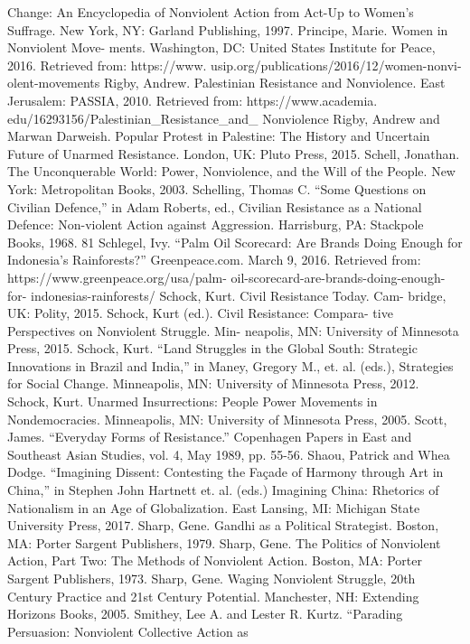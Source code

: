 \documentclass[twoside,a4paper,12pt,fleqn,openany]{extbook}
\begin{document}
Change: An Encyclopedia of Nonviolent Action
from Act-Up to Women’s Suffrage. New York,
NY: Garland Publishing, 1997.
Principe, Marie. Women in Nonviolent Move-
ments. Washington, DC: United States Institute
for Peace, 2016. Retrieved from: https://www.
usip.org/publications/2016/12/women-nonvi-
olent-movements
Rigby, Andrew. Palestinian Resistance and
Nonviolence. East Jerusalem: PASSIA, 2010.
Retrieved from: https://www.academia.
edu/16293156/Palestinian_Resistance_and_
Nonviolence
Rigby, Andrew and Marwan Darweish. Popular
Protest in Palestine: The History and Uncertain
Future of Unarmed Resistance. London, UK:
Pluto Press, 2015.
Schell, Jonathan. The Unconquerable World:
Power, Nonviolence, and the Will of the People.
New York: Metropolitan Books, 2003.
Schelling, Thomas C. “Some Questions on
Civilian Defence,” in Adam Roberts, ed., Civilian
Resistance as a National Defence: Non-violent
Action against Aggression. Harrisburg, PA:
Stackpole Books, 1968.
81
Schlegel, Ivy. “Palm Oil Scorecard: Are Brands
Doing Enough for Indonesia’s Rainforests?”
Greenpeace.com. March 9, 2016. Retrieved
from: https://www.greenpeace.org/usa/palm-
oil-scorecard-are-brands-doing-enough-for-
indonesias-rainforests/
Schock, Kurt. Civil Resistance Today. Cam-
bridge, UK: Polity, 2015.
Schock, Kurt (ed.). Civil Resistance: Compara-
tive Perspectives on Nonviolent Struggle. Min-
neapolis, MN: University of Minnesota Press,
2015.
Schock, Kurt. “Land Struggles in the Global
South: Strategic Innovations in Brazil and India,”
in Maney, Gregory M., et. al. (eds.), Strategies
for Social Change. Minneapolis, MN: University
of Minnesota Press, 2012.
Schock, Kurt. Unarmed Insurrections: People
Power Movements in Nondemocracies.
Minneapolis, MN: University of Minnesota
Press, 2005.
Scott, James. “Everyday Forms of Resistance.”
Copenhagen Papers in East and Southeast
Asian Studies, vol. 4, May 1989, pp. 55-56.
Shaou, Patrick and Whea Dodge. “Imagining
Dissent: Contesting the Façade of Harmony
through Art in China,” in Stephen John Hartnett
et. al. (eds.) Imagining China: Rhetorics
of Nationalism in an Age of Globalization.
East Lansing, MI: Michigan State University
Press, 2017.
Sharp, Gene. Gandhi as a Political Strategist.
Boston, MA: Porter Sargent Publishers, 1979.
Sharp, Gene. The Politics of Nonviolent Action,
Part Two: The Methods of Nonviolent Action.
Boston, MA: Porter Sargent Publishers, 1973.
Sharp, Gene. Waging Nonviolent Struggle,
20th Century Practice and 21st Century Potential.
Manchester, NH: Extending Horizons Books,
2005.
Smithey, Lee A. and Lester R. Kurtz. “Parading
Persuasion: Nonviolent Collective Action as
\end{document}
